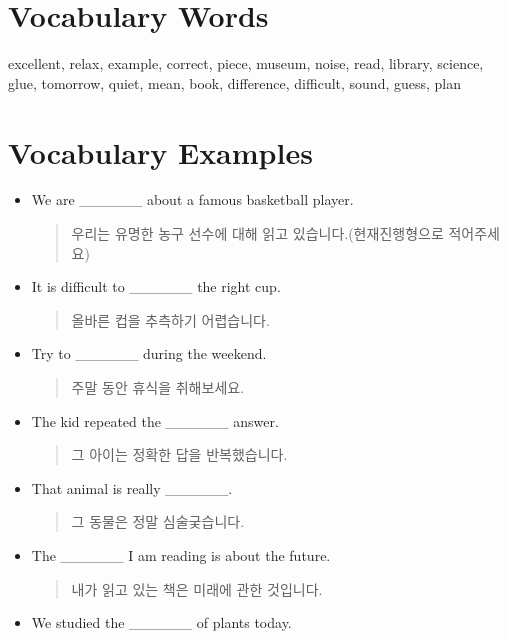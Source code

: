 \documentclass{article}
\begin{document}
\renewcommand{\familydefault}{\sfdefault}
\onehalfspacing
\fontsize{12pt}{14pt}\selectfont

\section*{Vocabulary Words}
\begin{addmargin}[1em]{1em}
excellent, relax, example, correct, piece, museum, noise, read, library, science, glue, tomorrow, quiet, mean, book, difference, difficult, sound, guess, plan
\end{addmargin}

\section*{Vocabulary Examples}
\begin{addmargin}[1em]{1em}
\begin{itemize}
    \item We are \_\_\_\_\_\_ about a famous basketball player.
    \begin{quote}
    우리는 유명한 농구 선수에 대해 읽고 있습니다.(현재진행형으로 적어주세요)
    \end{quote}
    \item It is difficult to \_\_\_\_\_\_ the right cup.
    \begin{quote}
    올바른 컵을 추측하기 어렵습니다.
    \end{quote}
    \item Try to \_\_\_\_\_\_ during the weekend.
    \begin{quote}
    주말 동안 휴식을 취해보세요.
    \end{quote}
    \item The kid repeated the \_\_\_\_\_\_ answer.
    \begin{quote}
    그 아이는 정확한 답을 반복했습니다.
    \end{quote}
    \item That animal is really \_\_\_\_\_\_.
    \begin{quote}
    그 동물은 정말 심술궂습니다.
    \end{quote}
    \item The \_\_\_\_\_\_ I am reading is about the future.
    \begin{quote}
    내가 읽고 있는 책은 미래에 관한 것입니다.
    \end{quote}
    \item We studied the \_\_\_\_\_\_ of plants today.
    \begin{quote}

\end{quote}
\end{itemize}
\end{addmargin}
\end{document}
